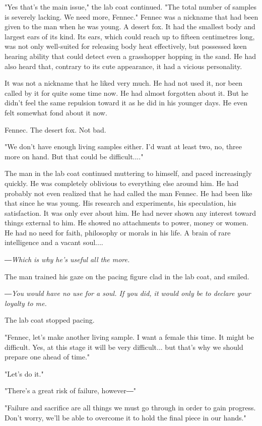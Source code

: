 "Yes that's the main issue," the lab coat continued. "The total number
of samples is severely lacking. We need more, Fennec." Fennec was a
nickname that had been given to the man when he was young. A desert fox.
It had the smallest body and largest ears of its kind. Its ears, which
could reach up to fifteen centimetres long, was not only well-suited for
releasing body heat effectively, but possessed keen hearing ability that
could detect even a grasshopper hopping in the sand. He had also heard
that, contrary to its cute appearance, it had a vicious personality.

It was not a nickname that he liked very much. He had not used it, nor
been called by it for quite some time now. He had almost forgotten about
it. But he didn't feel the same repulsion toward it as he did in his
younger days. He even felt somewhat fond about it now.

Fennec. The desert fox. Not bad.

"We don't have enough living samples either. I'd want at least two, no,
three more on hand. But that could be difficult...."

The man in the lab coat continued muttering to himself, and paced
increasingly quickly. He was completely oblivious to everything else
around him. He had probably not even realized that he had called the man
Fennec. He had been like that since he was young. His research and
experiments, his speculation, his satisfaction. It was only ever about
him. He had never shown any interest toward things external to him. He
showed no attachments to power, money or women. He had no need for
faith, philosophy or morals in his life. A brain of rare intelligence
and a vacant soul....

\emph{―Which is why he's useful all the more.}

The man trained his gaze on the pacing figure clad in the lab coat, and
smiled.

\emph{―You would have no use for a soul. If you did, it would only be to
	declare your loyalty to me.}

The lab coat stopped pacing.

"Fennec, let's make another living sample. I want a female this time. It
might be difficult. Yes, at this stage it will be very difficult... but
that's why we should prepare one ahead of time."

"Let's do it."

"There's a great risk of failure, however―"

"Failure and sacrifice are all things we must go through in order to
gain progress. Don't worry, we'll be able to overcome it to hold the
final piece in our hands."

